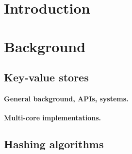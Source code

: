 \documentclass[11pt]{article} %
\begin{document}
\maketitle %

\begin{abstract}
\end{abstract}
\tableofcontents %
\listoffigures  %
\listoftables   %

\newpage
\section{Introduction}

\newpage
\section{Background}
\subsection{Key-value stores}
\paragraph{General background, APIs, systems.}
\paragraph{Multi-core implementations.}
\subsection{Hashing algorithms}
\end{document}
